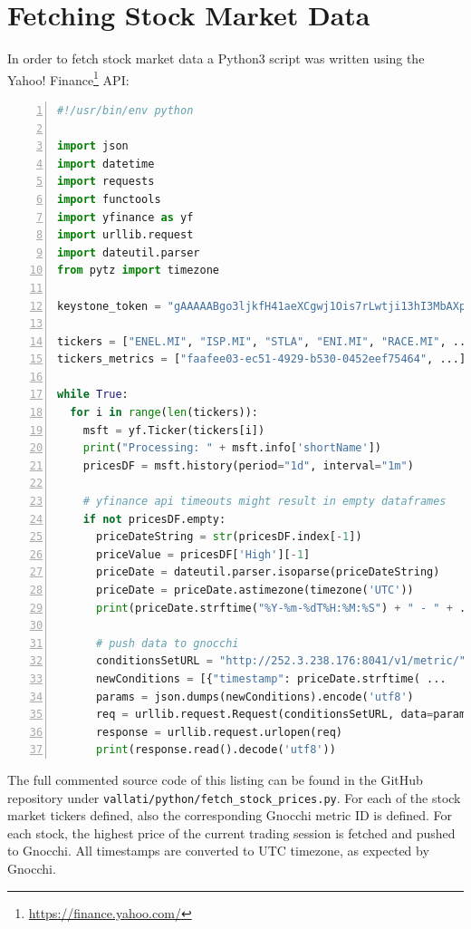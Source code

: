 \documentclass[11pt,a4paper]{article}
\begin{document}
\section{Fetching Stock Market Data}
In order to fetch stock market data a Python3 script was written using the Yahoo! Finance\footnote{\url{https://finance.yahoo.com/}} API:
\begin{lstlisting}[language=python,caption={fetch\_stock\_prices.py},numbers=left]
#!/usr/bin/env python

import json
import datetime
import requests
import functools
import yfinance as yf
import urllib.request
import dateutil.parser
from pytz import timezone

keystone_token = "gAAAAABgo3ljkfH41aeXCgwj1Ois7rLwtji13hI3MbAXpJ..."

tickers = ["ENEL.MI", "ISP.MI", "STLA", "ENI.MI", "RACE.MI", ...];
tickers_metrics = ["faafee03-ec51-4929-b530-0452eef75464", ...]

while True:
  for i in range(len(tickers)):
    msft = yf.Ticker(tickers[i])
    print("Processing: " + msft.info['shortName'])
    pricesDF = msft.history(period="1d", interval="1m")

    # yfinance api timeouts might result in empty dataframes
    if not pricesDF.empty:
      priceDateString = str(pricesDF.index[-1])
      priceValue = pricesDF['High'][-1]
      priceDate = dateutil.parser.isoparse(priceDateString)
      priceDate = priceDate.astimezone(timezone('UTC'))
      print(priceDate.strftime("%Y-%m-%dT%H:%M:%S") + " - " + ...)

      # push data to gnocchi
      conditionsSetURL = "http://252.3.238.176:8041/v1/metric/" + ...
      newConditions = [{"timestamp": priceDate.strftime( ...
      params = json.dumps(newConditions).encode('utf8')
      req = urllib.request.Request(conditionsSetURL, data=params, ...
      response = urllib.request.urlopen(req)
      print(response.read().decode('utf8'))
\end{lstlisting}
The full commented source code of this listing can be found in the GitHub repository under \texttt{vallati/python/fetch\_stock\_prices.py}. For each of the stock market tickers defined, also the corresponding Gnocchi metric ID is defined. For each stock, the highest price of the current trading session is fetched and pushed to Gnocchi. All timestamps are converted to UTC timezone, as expected by Gnocchi.
\end{document}
